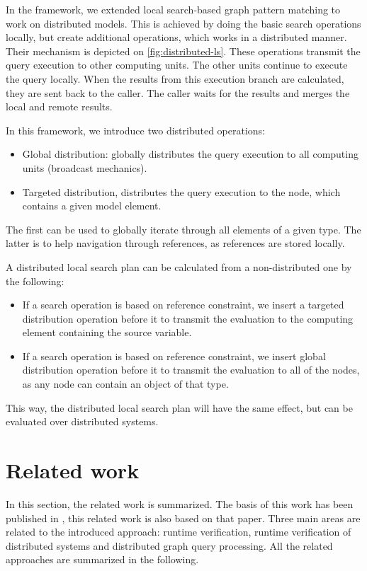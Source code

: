 In the framework, we extended local search-based graph pattern matching to work on distributed models.
This is achieved by doing the basic search operations locally, but create additional operations, which works in a distributed manner. 
Their mechanism is depicted on \autoref{fig:distributed-ls}.
These operations transmit the query execution to other computing units.
The other units continue to execute the query locally. When the results from this execution branch are calculated, they are sent back to the caller.
The caller waits for the results and merges the local and remote results.

In this framework, we introduce two distributed operations:
\begin{itemize}
	\item Global distribution: globally distributes the query execution to all computing units (broadcast mechanics).
	\item Targeted distribution, distributes the query execution to the node, which contains a given model element.
\end{itemize}

The first can be used to globally iterate through all elements of a given type. 
The latter is to help navigation through references, as references are stored locally.

A distributed local search plan can be calculated from a non-distributed one by the following:
\begin{itemize}
	\item If a search operation is based on reference constraint, we insert a targeted distribution operation before it to transmit the evaluation to the computing element containing the source variable.
	\item If a search operation is based on reference constraint, we insert global distribution operation before it to transmit the evaluation to all of the nodes, as any node can contain an object of that type.
\end{itemize}

This way, the distributed local search plan will have the same effect, but can be evaluated over distributed systems.


\section{Related work}

\newcommand{\mrt}{models\-@ run\-time\space}

In this section, the related work is summarized. The basis of this work has been published in \cite{FASE}, this related work is also based on that paper. Three main areas are related to the introduced approach: runtime verification, runtime verification of distributed systems and distributed graph query processing. All the related approaches are summarized in the following.

